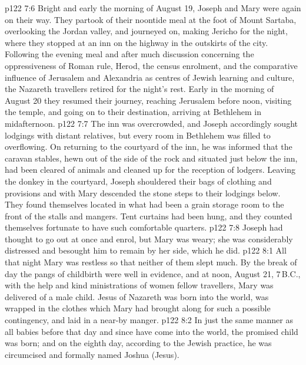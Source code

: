 \vs p122 7:6 Bright and early the morning of August 19, Joseph and Mary were again on their way. They partook of their noontide meal at the foot of Mount Sartaba, overlooking the Jordan valley, and journeyed on, making Jericho for the night, where they stopped at an inn on the highway in the outskirts of the city. Following the evening meal and after much discussion concerning the oppressiveness of Roman rule, Herod, the census enrolment, and the comparative influence of Jerusalem and Alexandria as centres of Jewish learning and culture, the Nazareth travellers retired for the night’s rest. Early in the morning of August 20 they resumed their journey, reaching Jerusalem before noon, visiting the temple, and going on to their destination, arriving at Bethlehem in midafternoon.
\vs p122 7:7 The inn was overcrowded, and Joseph accordingly sought lodgings with distant relatives, but every room in Bethlehem was filled to overflowing. On returning to the courtyard of the inn, he was informed that the caravan stables, hewn out of the side of the rock and situated just below the inn, had been cleared of animals and cleaned up for the reception of lodgers. Leaving the donkey in the courtyard, Joseph shouldered their bags of clothing and provisions and with Mary descended the stone steps to their lodgings below. They found themselves located in what had been a grain storage room to the front of the stalls and mangers. Tent curtains had been hung, and they counted themselves fortunate to have such comfortable quarters.
\vs p122 7:8 Joseph had thought to go out at once and enrol, but Mary was weary; she was considerably distressed and besought him to remain by her side, which he did.
\vs p122 8:1 All that night Mary was restless so that neither of them slept much. By the break of day the pangs of childbirth were well in evidence, and at noon, August 21, 7\,B.C., with the help and kind ministrations of women fellow travellers, Mary was delivered of a male child. Jesus of Nazareth was born into the world, was wrapped in the clothes which Mary had brought along for such a possible contingency, and laid in a near\hyp{}by manger.
\vs p122 8:2 In just the same manner as all babies before that day and since have come into the world, the promised child was born; and on the eighth day, according to the Jewish practice, he was circumcised and formally named Joshua (Jesus).
